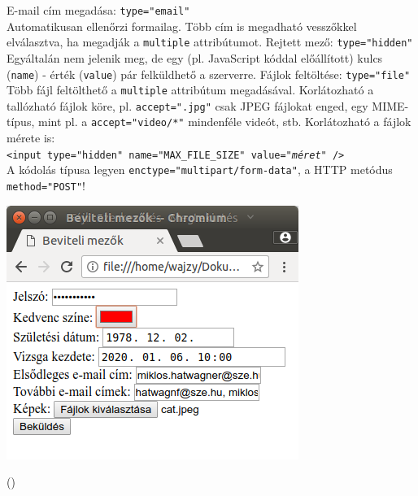 \begin{frame}
  E-mail cím megadása: \texttt{type="email"}\\
  Automatikusan ellenőrzi formailag. Több cím is megadható vesszőkkel elválasztva, ha megadják a \texttt{multiple} attribútumot.
  \vfill
  Rejtett mező: \texttt{type="hidden"}\\
  Egyáltalán nem jelenik meg, de egy (pl. JavaScript kóddal előállított) kulcs 
  (\texttt{name}) - érték (\texttt{value}) pár felküldhető a szerverre.
  \vfill
  Fájlok feltöltése: \texttt{type="file"}\\
  Több fájl feltölthető a \texttt{multiple} attribútum megadásával. 
  Korlátozható a tallózható fájlok köre, pl. \texttt{accept=".jpg"} csak 
  JPEG fájlokat enged, egy MIME-típus, mint pl. a \texttt{accept="video/*"} 
  mindenféle videót, stb. Korlátozható a fájlok mérete is:\\
  \texttt{<input type="hidden" name="MAX\_FILE\_SIZE" value="\emph{méret}" />}\\
  A kódolás típusa legyen \texttt{enctype="multipart/form-data"}, a HTTP 
  metódus \texttt{method="POST"}!
\end{frame}

\begin{frame}
  \begin{center}
    \includegraphics[width=.5\textwidth]{urlap3.png}
  \end{center}
\end{frame}

\begin{frame}
  \begin{exampleblock}{ ()}
    \footnotesize
    
  \end{exampleblock}
\end{frame}

